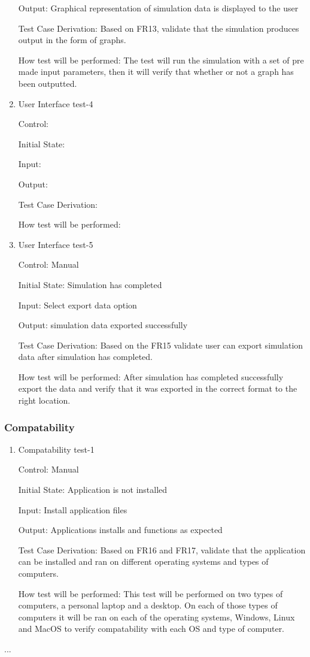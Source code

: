 \documentclass[12pt, titlepage]{article}
\begin{document}
\begin{enumerate}
  Output: Graphical representation of simulation data is displayed to the user
  
  Test Case Derivation: Based on FR13, validate that the simulation produces output in the form of graphs.
  
  How test will be performed: The test will run the simulation with a set of pre made input parameters, then it will verify that whether or not a graph has been outputted. 
  \item {User Interface test-4\\}
  
  Control: 
            
  Initial State:
            
  Input: 
            
  Output: 
  
  Test Case Derivation: 
  
  How test will be performed: 
  \item {User Interface test-5\\}
  
  Control: Manual
            
  Initial State: Simulation has completed
            
  Input: Select export data option
            
  Output: simulation data exported successfully
  
  Test Case Derivation: Based on the FR15 validate user can export simulation data after simulation has completed.
  
  How test will be performed: After simulation has completed successfully export the data and verify that it was exported in the correct format to the right location.

\end{enumerate}

  \subsubsection{Compatability}
  \begin{enumerate}
  \item {Compatability test-1\\}
  
  Control: Manual
            
  Initial State: Application is not installed
            
  Input: Install application files
            
  Output: Applications installs and functions as expected
  
  Test Case Derivation: Based on FR16 and FR17, validate that the application can be installed and ran on different operating systems and types of computers. 
  
  How test will be performed: This test will be performed on two types of computers, a personal laptop and a desktop. On each of those types of computers it will be ran on each of the operating systems, Windows, Linux and MacOS to verify compatability with each OS and type of computer.

  \end{enumerate}
...
\end{document}
